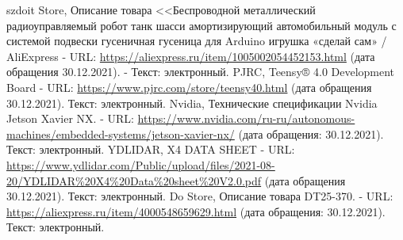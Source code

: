 \documentclass[12pt,a4paper]{scrartcl}
\begin{document}
\begin{thebibliography}{5}
		 szdoit Store, Описание товара <<Беспроводной металлический радиоуправляемый робот танк шасси амортизирующий автомобильный модуль с системой подвески гусеничная гусеница для Arduino игрушка «сделай сам» / AliExpress - URL: \url{https://aliexpress.ru/item/1005002054452153.html} (дата обращения 30.12.2021). - Текст: электронный.
		 PJRC, Teensy® 4.0 Development Board - URL: \url{https://www.pjrc.com/store/teensy40.html} (дата обращения 30.12.2021). Текст: электронный.
                 Nvidia, Технические спецификации Nvidia Jetson Xavier NX. - URL: \url{https://www.nvidia.com/ru-ru/autonomous-machines/embedded-systems/jetson-xavier-nx/} (дата обращения: 30.12.2021). Текст: электронный.
                 YDLIDAR, X4 DATA SHEET - URL: \url{https://www.ydlidar.com/Public/upload/files/2021-08-20/YDLIDAR%20X4%20Data%20sheet%20V2.0.pdf} (дата обращения 30.12.2021). Текст: электронный.
                 Do Store, Описание товара DT25-370. - URL: \url{https://aliexpress.ru/item/4000548659629.html} (дата обращения: 30.12.2021). Текст: электронный.
	\end{thebibliography}
	
\end{document}
